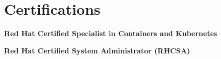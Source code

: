 \section{Certifications}
    \resumeSubHeadingListStart

     \resumeProjectHeading
    {\textbf{Red Hat Certified Specialist in Containers and Kubernetes}}{}
    {}{}

     \resumeProjectHeading
    {\textbf{Red Hat Certified System Administrator (RHCSA)}}{}
    {}{}

    \resumeSubHeadingListEnd